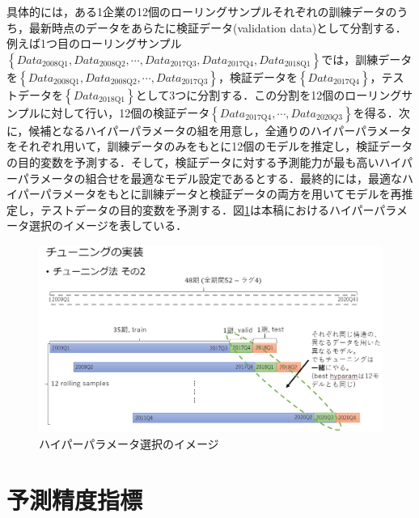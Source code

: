 \documentclass[a4paper，12pt]{jsarticle}
\begin{document}
具体的には，ある1企業の12個のローリングサンプルそれぞれの訓練データのうち，最新時点のデータをあらたに検証データ(validation data)として分割する．例えば1つ目のローリングサンプル$\left\{Data_{\text{2008Q1}}, Data_{\text{2008Q2}}, \cdots, Data_{\text{2017Q3}}, Data_{\text{2017Q4}}, Data_{\text{2018Q1}}\right\}$では，訓練データを$\left\{Data_{\text{2008Q1}}, Data_{\text{2008Q2}}, \cdots, Data_{\text{2017Q3}}\right\}$，検証データを$\left\{Data_{\text{2017Q4}}\right\}$，テストデータを$\left\{Data_{\text{2018Q1}}\right\}$として3つに分割する．この分割を12個のローリングサンプルに対して行い，12個の検証データ$\left\{Data_{\text{2017Q4}}, \cdots , Data_{2020Q3}\right\}$を得る．次に，候補となるハイパーパラメータの組を用意し，全通りのハイパーパラメータをそれぞれ用いて，訓練データのみをもとに12個のモデルを推定し，検証データの目的変数を予測する．そして，検証データに対する予測能力が最も高いハイパーパラメータの組合せを最適なモデル設定であるとする．最終的には，最適なハイパーパラメータをもとに訓練データと検証データの両方を用いてモデルを再推定し，テストデータの目的変数を予測する．図\ref{fig:hyparam_selection}は本稿におけるハイパーパラメータ選択のイメージを表している．


\begin{figure}
  \centering
  \caption{ハイパーパラメータ選択のイメージ}
  \label{fig:hyparam_selection}
  \includegraphics[width=12cm]{./img/_rolling_sample_val_i.png}
\end{figure}


\section{予測精度指標}
\end{document}
